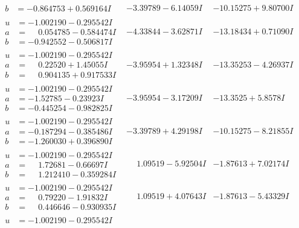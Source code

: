 \documentclass[1p]{elsarticle_modified}
\theoremstyle{definition}
\begin{document}
$$\begin{array}{c|c|c}
\begin{aligned}
b &= -0.864753 + 0.569164 I\end{aligned}
 & -3.39789 - 6.14059 I & -10.15275 + 9.80700 I \\ \hline\begin{aligned}
u &= -1.002190 - 0.295542 I \\
a &= \phantom{-}0.054785 - 0.584474 I \\
b &= -0.942552 - 0.506817 I\end{aligned}
 & -4.33844 - 3.62871 I & -13.18434 + 0.71090 I \\ \hline\begin{aligned}
u &= -1.002190 - 0.295542 I \\
a &= \phantom{-}0.22520 + 1.45055 I \\
b &= \phantom{-}0.904135 + 0.917533 I\end{aligned}
 & -3.95954 + 1.32348 I & -13.35253 - 4.26937 I \\ \hline\begin{aligned}
u &= -1.002190 - 0.295542 I \\
a &= -1.52785 - 0.23923 I \\
b &= -0.445254 - 0.982825 I\end{aligned}
 & -3.95954 - 3.17209 I & -13.3525 + 5.8578 I \\ \hline\begin{aligned}
u &= -1.002190 - 0.295542 I \\
a &= -0.187294 - 0.385486 I \\
b &= -1.260030 + 0.396890 I\end{aligned}
 & -3.39789 + 4.29198 I & -10.15275 - 8.21855 I \\ \hline\begin{aligned}
u &= -1.002190 - 0.295542 I \\
a &= \phantom{-}1.72681 - 0.66697 I \\
b &= \phantom{-}1.212410 - 0.359284 I\end{aligned}
 & \phantom{-}1.09519 - 5.92504 I & -1.87613 + 7.02174 I \\ \hline\begin{aligned}
u &= -1.002190 - 0.295542 I \\
a &= \phantom{-}0.79220 - 1.91832 I \\
b &= \phantom{-}0.446646 - 0.930935 I\end{aligned}
 & \phantom{-}1.09519 + 4.07643 I & -1.87613 - 5.43329 I \\ \hline\begin{aligned}
u &= -1.002190 - 0.295542 I \\

\end{aligned}
\end{array}$$
\end{document}
